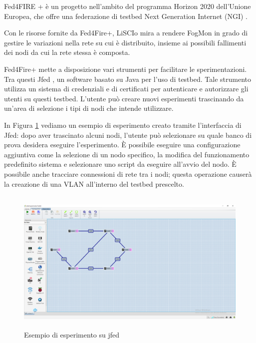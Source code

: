     
    Fed4FIRE + è un progetto nell'ambito del programma Horizon 2020 dell'Unione Europea, che offre una federazione di testbed Next Generation Internet (NGI) \cite{Fed4Fire+}.
    
    
    Con le risorse fornite da Fed4Fire+, LiSCIo mira a rendere FogMon in grado di gestire le variazioni nella rete su cui è distribuito, insieme ai possibili fallimenti dei nodi da cui la rete stessa è composta.
    
    
    Fed4Fire+ mette a disposizione vari strumenti per facilitare le sperimentazioni. Tra questi  Jfed \cite{jfed}, un software basato su Java per l'uso di testbed. Tale strumento utilizza un sistema di credenziali e di certificati per autenticare e autorizzare gli utenti su questi testbed. L'utente può creare nuovi esperimenti trascinando da un'area di selezione i tipi di nodi che intende utilizzare.
    
    
    In Figura \ref{fig:jfed} vediamo un esempio di esperimento creato tramite l'interfaccia di Jfed: dopo aver trascinato alcuni nodi, l'utente può selezionare su quale banco di prova desidera eseguire l'esperimento. È possibile eseguire una configurazione aggiuntiva come la selezione di un nodo specifico, la modifica del funzionamento predefinito sistema e selezionare uno script da eseguire all'avvio del nodo. È possibile anche tracciare connessioni di rete tra i nodi; questa operazione causerà la creazione di una VLAN all'interno del testbed prescelto.
    \begin {figure}
    \begin{center}
            \includegraphics[width=13cm, height=7cm]{images/jfed.png}
            \caption {Esempio di esperimento su jfed}
            \label {fig:jfed}
    \end{center}
    \end {figure}
    
